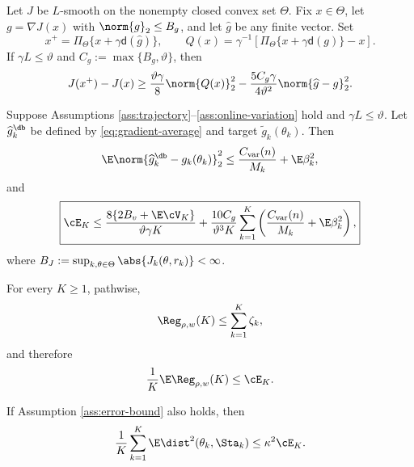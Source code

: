 \begin{lemma}\label{lem:projected-ascent}
Let $J$ be $L$-smooth on the nonempty closed convex set $\Theta$.  Fix $x\in\Theta$, let $g=\nabla J(x)$ with $\norm{g}_2\le B_g$, and let $\widehat g$ be any finite vector.  Set
\[
 x^+=\Pi_\Theta\{x+\gamma\mathsf d(\widehat g)\},
 \qquad
 Q(x)=\gamma^{-1}[\Pi_\Theta\{x+\gamma\mathsf d(g)\}-x].
\]
If $\gamma L\le\vartheta$ and $C_g:=\max\{B_g,\vartheta\}$, then
\begin{equation}\label{eq:one-step-ascent}
 J(x^+)-J(x)
 \ge\frac{\vartheta\gamma}{8}\norm{Q(x)}_2^2
 -\frac{5C_g\gamma}{4\vartheta^2}\norm{\widehat g-g}_2^2.
\end{equation}
\end{lemma}

\begin{theorem}\label{thm:online-residual}
Suppose Assumptions \ref{ass:trajectory}--\ref{ass:online-variation} hold and $\gamma L\le\vartheta$.  Let $\widehat g_k^{\db}$ be defined by \eqref{eq:gradient-average} and target $\widetilde g_k(\theta_k)$.  Then
\begin{equation}\label{eq:true-gradient-mse}
 \E\norm{\widehat g_k^{\db}-g_k(\theta_k)}_2^2
 \le\frac{C_{\rm var}(n)}{M_k}+\E\beta_k^2,
\end{equation}
and
\begin{equation}\label{eq:online-residual-bound}
 \boxed{
 \cE_K
 \le
 \frac{8\{2B_v+\E\cV_K\}}{\vartheta\gamma K}
 +\frac{10C_g}{\vartheta^3K}
 \sum_{k=1}^{K}
 \left(\frac{C_{\rm var}(n)}{M_k}+\E\beta_k^2\right),
 }
\end{equation}
where $B_J:=\sup_{k,\theta\in\Theta}\abs{J_k(\theta,r_k)}<\infty$.
\end{theorem}

\begin{corollary}\label{cor:dynamic-local-regret}
For every $K\ge1$, pathwise,
\begin{equation}\label{eq:dynamic-local-regret-bound}
 \Reg_{\rho,w}(K)
 \le\sum_{k=1}^{K}\zeta_k,
\end{equation}
and therefore
\begin{equation}\label{eq:average-dynamic-local-regret-bound}
 \frac1K\E\Reg_{\rho,w}(K)
 \le\cE_K.
\end{equation}
\end{corollary}

\begin{corollary}\label{cor:stationary-tracking}
If Assumption \ref{ass:error-bound} also holds, then
\begin{equation}\label{eq:stationary-tracking}
 \frac1K\sum_{k=1}^{K}
 \E\dist^2(\theta_k,\Sta_k)
 \le\kappa^2\cE_K.
\end{equation}
\end{corollary}

